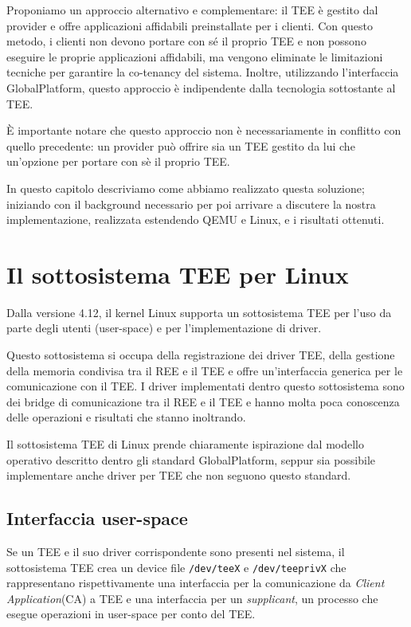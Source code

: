 \documentclass[12pt,italian]{report}
\begin{document}
Proponiamo un approccio alternativo e complementare: il TEE è gestito dal
provider e offre applicazioni affidabili preinstallate per i clienti.
Con questo metodo, i clienti non devono portare con sé il proprio TEE e
non possono eseguire le proprie applicazioni affidabili, ma vengono
eliminate le limitazioni tecniche per garantire la co-tenancy del sistema.
Inoltre, utilizzando l'interfaccia GlobalPlatform, questo approccio è
indipendente dalla tecnologia sottostante al TEE.

È importante notare che questo approccio non è necessariamente in conflitto
con quello precedente: un provider può offrire sia un TEE gestito da lui
che un'opzione per portare con sè il proprio TEE.

\bigbreak \noindent

In questo capitolo descriviamo come abbiamo realizzato questa soluzione;
iniziando con il background necessario per poi arrivare a discutere la nostra
implementazione, realizzata estendendo QEMU e Linux, e i risultati ottenuti.

\section{Il sottosistema TEE per Linux}
\label{sec:sottosistema-tee-per-linux}
Dalla versione 4.12, il kernel Linux supporta un sottosistema TEE
\cite{linux_tee_subsystem}
per l'uso da parte degli utenti (user-space) e per l'implementazione
di driver.

Questo sottosistema si occupa della registrazione dei driver TEE, della
gestione della memoria condivisa tra il REE e il TEE e offre un'interfaccia
generica per le comunicazione con il TEE.
I driver implementati dentro questo sottosistema sono dei bridge di
comunicazione tra il REE e il TEE e hanno molta poca conoscenza delle
operazioni e risultati che stanno inoltrando.

Il sottosistema TEE di Linux prende chiaramente ispirazione dal modello
operativo descritto dentro gli standard GlobalPlatform, seppur sia possibile
implementare anche driver per TEE che non seguono questo standard.

\subsection{Interfaccia user-space}
\label{subsec:interfaccia-user-space}
Se un TEE e il suo driver corrispondente sono presenti nel sistema,
il sottosistema TEE crea un device file \texttt{/dev/teeX} e
\texttt{/dev/teeprivX} che rappresentano rispettivamente una interfaccia
per la comunicazione da \textit{Client Application}(CA) a TEE e una
interfaccia per un \textit{supplicant}, un processo che esegue operazioni
in user-space per conto del TEE.
\end{document}
